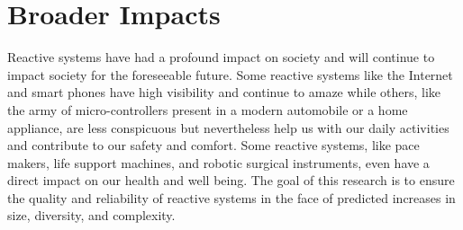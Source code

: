 
\section{Broader Impacts}

Reactive systems have had a profound impact on society and will continue to impact society for the foreseeable future.
Some reactive systems like the Internet and smart phones have high visibility and continue to amaze while others, like the army of micro-controllers present in a modern automobile or a home appliance, are less conspicuous but nevertheless help us with our daily activities and contribute to our safety and comfort.
Some reactive systems, like pace makers, life support machines, and robotic surgical instruments, even have a direct impact on our health and well being.
The goal of this research is to ensure the quality and reliability of reactive systems in the face of predicted increases in size, diversity, and complexity.



